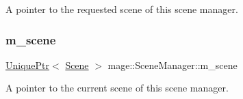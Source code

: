 A pointer to the requested scene of this scene manager. \hypertarget{classmage_1_1_scene_manager_a774c610dba3ece25acf97915b6368a1a}{}\label{classmage_1_1_scene_manager_a774c610dba3ece25acf97915b6368a1a} 
\subsubsection{\texorpdfstring{m\+\_\+scene}{m\_scene}}
{\footnotesize\ttfamily \hyperlink{namespacemage_a3316d7143a973e37adf1110f2e80ca31}{Unique\+Ptr}$<$ \hyperlink{classmage_1_1_scene}{Scene} $>$ mage\+::\+Scene\+Manager\+::m\+\_\+scene\hspace{0.3cm}{\ttfamily [private]}}

A pointer to the current scene of this scene manager. 